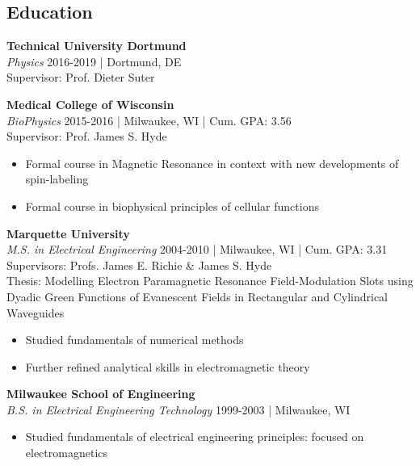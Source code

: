 \subsection*{Education} 
\vspace{-0.5em}
\noindent\textbf{Technical University Dortmund} \\
\textit{Physics} 2016-2019 | Dortmund, DE \\
Supervisor: Prof. Dieter Suter 
\newline

\noindent\textbf{Medical College of Wisconsin} \\
\textit{BioPhysics} 2015-2016 | Milwaukee, WI | Cum. GPA: 3.56 \\
Supervisor: Prof. James S. Hyde
\vspace{-0.5em}
\begin{itemize}
\setlength\itemsep{-0.5em}
    \item Formal course in Magnetic Resonance in context with new developments of spin-labeling
    \item Formal course in biophysical principles of cellular functions 
\end{itemize}

\noindent\textbf{Marquette University} \\
\textit{M.S. in Electrical Engineering} 2004-2010 | Milwaukee, WI | Cum. GPA: 3.31 \\
Supervisors: Profs. James E. Richie \& James S. Hyde \\
Thesis: Modelling Electron Paramagnetic Resonance Field-Modulation Slots using Dyadic Green Functions of Evanescent Fields in Rectangular and Cylindrical Waveguides
\vspace{-0.5em}
\begin{itemize}
\setlength\itemsep{-0.5em}
    \item Studied fundamentals of numerical methods
    \item Further refined analytical skills in electromagnetic theory 
\end{itemize}

\noindent\textbf{Milwaukee School of Engineering}\\
\textit{B.S. in Electrical Engineering Technology}
1999-2003 | Milwaukee, WI
\vspace{-0.5em}
\begin{itemize}
\setlength\itemsep{-0.5em}
    \item Studied fundamentals of electrical engineering principles: focused on electromagnetics
\end{itemize}


